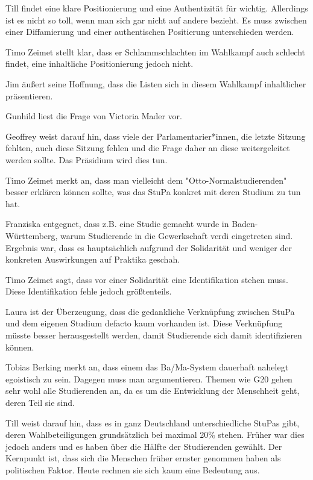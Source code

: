 \documentclass[ngerman,headheight=70pt]{scrartcl}
\begin{document}
    Till findet eine klare Positionierung und eine Authentizität für wichtig.
    Allerdings ist es nicht so toll, wenn man sich gar nicht auf andere bezieht.
    Es muss zwischen einer Diffamierung und einer authentischen Positierung
    unterschieden werden.

    Timo Zeimet stellt klar, dass er Schlammschlachten im Wahlkampf auch schlecht
    findet, eine inhaltliche Positionierung jedoch nicht.

    Jim äußert seine Hoffnung, dass die Listen sich in diesem Wahlkampf inhaltlicher
    präsentieren.

    Gunhild liest die Frage von Victoria Mader vor.

    Geoffrey weist darauf hin, dass viele der Parlamentarier*innen, die letzte Sitzung
    fehlten, auch diese Sitzung fehlen und die Frage daher an diese weitergeleitet
    werden sollte. Das Präsidium wird dies tun.

    Timo Zeimet merkt an, dass man vielleicht dem "Otto-Normalstudierenden"
    besser erklären können sollte, was das StuPa konkret mit deren Studium zu tun
    hat.

    Franziska entgegnet, dass z.B. eine Studie gemacht wurde in Baden-Württemberg,
    warum Studierende in die Gewerkschaft verdi eingetreten sind. Ergebnis war, dass
    es hauptsächlich aufgrund der Solidarität und weniger der konkreten Auswirkungen
    auf Praktika geschah.

    Timo Zeimet sagt, dass vor einer Solidarität eine Identifikation stehen muss.
    Diese Identifikation fehle jedoch größtenteils.

    Laura ist der Überzeugung, dass die gedankliche Verknüpfung zwischen StuPa
    und dem eigenen Studium defacto kaum vorhanden ist. Diese Verknüpfung müsste
    besser herausgestellt werden, damit Studierende sich damit identifizieren können.

    Tobias Berking merkt an, dass einem das Ba/Ma-System dauerhaft nahelegt
    egoistisch zu sein. Dagegen muss man argumentieren. Themen wie G20 gehen sehr
    wohl alle Studierenden an, da es um die Entwicklung der Menschheit geht, deren
    Teil sie sind.

    Till weist darauf hin, dass es in ganz Deutschland unterschiedliche StuPas gibt,
    deren Wahlbeteiligungen grundsätzlich bei maximal 20\% stehen. Früher war dies
    jedoch anders und es haben über die Hälfte der Studierenden gewählt.
    Der Kernpunkt ist, dass sich die Menschen früher ernster genommen haben als
    politischen Faktor. Heute rechnen sie sich kaum eine Bedeutung aus.
\end{document}
